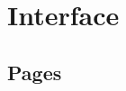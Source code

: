 
\chapter{Interface} %



\ifpdf
    \graphicspath{{5/figures/PNG/}{5/figures/PDF/}{5/figures/}}
\else
    \graphicspath{{5/figures/EPS/}{5/figures/}}
\fi


\section{Pages}












